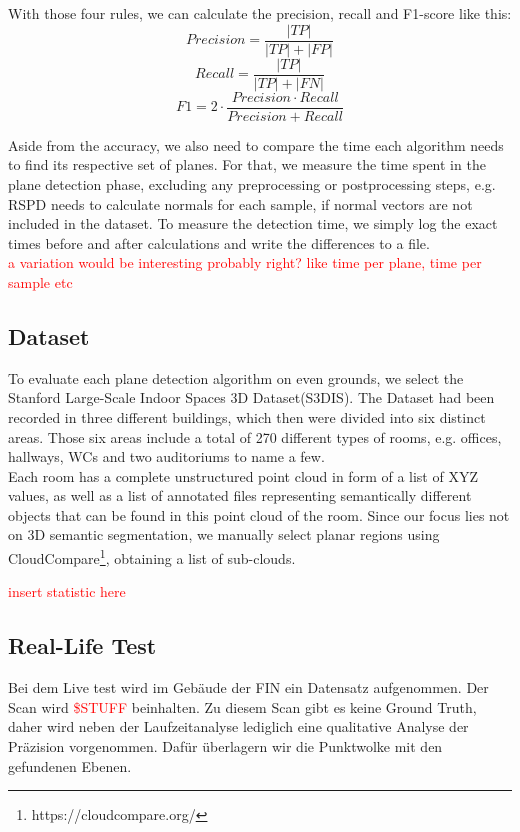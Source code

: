 \documentclass[main.tex]{subfiles}
\begin{document}
With those four rules, we can calculate the precision, recall and F1-score like this:
$$Precision = \frac{|TP|}{|TP|+|FP|}$$  
$$Recall = \frac{|TP|}{|TP|+|FN|}$$  
$$F1 = 2 \cdot\frac{Precision\cdot Recall}{Precision + Recall}$$  

Aside from the accuracy, we also need to compare the time each algorithm needs to find its respective set of planes.
For that, we measure the time spent in the plane detection phase, excluding any preprocessing or postprocessing steps, e.g. RSPD needs to calculate normals for each sample, 
if normal vectors are not included in the dataset. 
To measure the detection time, we simply log the exact times before and after calculations and write the differences to a file.\\
\textcolor{red}{a variation would be interesting probably right? like time per plane, time per sample etc}



\subsection{Dataset}
To evaluate each plane detection algorithm on even grounds, we select the Stanford Large-Scale Indoor Spaces 3D Dataset(S3DIS). The Dataset had been recorded in three different buildings, 
which then were divided into six distinct areas. Those six areas include a total of 270 different types of rooms, e.g. offices, hallways, WCs and two auditoriums to name a few.\\
Each room has a complete unstructured point cloud in form of a list of XYZ values, as well as a list of annotated files representing semantically different objects that can be found in this point cloud 
of the room. 
Since our focus lies not on 3D semantic segmentation, we manually select planar regions using CloudCompare\footnote{https://cloudcompare.org/}, obtaining a list of sub-clouds.

\textcolor{red}{insert statistic here}

\subsection{Real-Life Test}
Bei dem Live test wird im Gebäude der FIN ein Datensatz aufgenommen. Der Scan wird %
\textcolor{red}{\$STUFF} beinhalten.
Zu diesem Scan gibt es keine Ground Truth, daher wird neben der Laufzeitanalyse lediglich eine qualitative Analyse der
Präzision vorgenommen.
Dafür überlagern wir die Punktwolke mit den gefundenen Ebenen.
\end{document}
